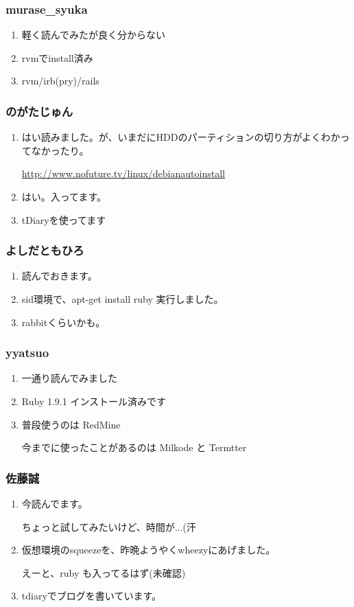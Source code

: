 \documentclass[cjk,dvipdfmx,10pt,compress,%
hyperref={bookmarks=true,bookmarksnumbered=true,bookmarksopen=false,%
colorlinks=false,%
pdftitle={第 69 回 関西 Debian 勉強会},%
pdfauthor={倉敷・のがた・佐々木・かわだ},%
pdfsubject={資料},%
}]{beamer}
\begin{document}
\begin{frame}
  \frametitle{ murase\_{}syuka }
  \begin{enumerate}
  \item 軽く読んでみたが良く分からない
  \item rvmでinstall済み
  \item rvm/irb(pry)/rails
  \end{enumerate}
\end{frame}

\begin{frame}
  \frametitle{ のがたじゅん }
  \begin{enumerate}
  \item はい読みました。が、いまだにHDDのパーティションの切り方がよくわかってなかったり。

    \url{http://www.nofuture.tv/linux/debianautoinstall}
  \item はい。入ってます。
  \item tDiaryを使ってます
  \end{enumerate}
\end{frame}

\begin{frame}
  \frametitle{ よしだともひろ }
  \begin{enumerate}
  \item 読んでおきます。
  \item sid環境で、apt-get install ruby 実行しました。
  \item rabbitくらいかも。
  \end{enumerate}
\end{frame}

\begin{frame}
  \frametitle{ yyatsuo }
  \begin{enumerate}
  \item 一通り読んでみました
  \item Ruby 1.9.1 インストール済みです
  \item 普段使うのは RedMine

    今までに使ったことがあるのは Milkode と Termtter
  \end{enumerate}
\end{frame}

\begin{frame}
  \frametitle{ 佐藤誠 }
  \begin{enumerate}
  \item 今読んでます。

    ちょっと試してみたいけど、時間が...(汗
  \item 仮想環境のsqueezeを、昨晩ようやくwheezyにあげました。

    えーと、ruby も入ってるはず(未確認)
  \item tdiaryでブログを書いています。
  \end{enumerate}
\end{frame}
\end{document}

